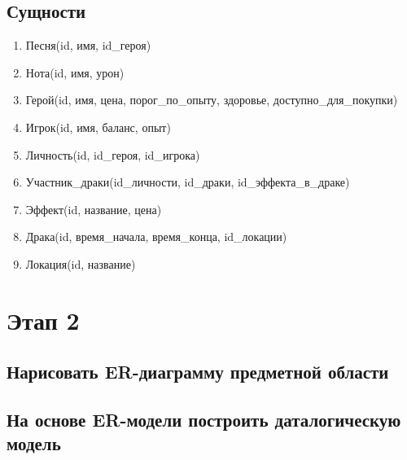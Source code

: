 \subsection*{Сущности}


\begin{enumerate}
    \item Песня(id, имя, id\_героя)
    \item Нота(id, имя, урон)
    \item Герой(id, имя, цена, порог\_по\_опыту, здоровье, доступно\_для\_покупки)
    \item Игрок(id, имя, баланс, опыт)
    \item Личность(id, id\_героя, id\_игрока)
    \item Участник\_драки(id\_личности, id\_драки, id\_эффекта\_в\_драке)
    \item Эффект(id, название, цена)
    \item Драка(id, время\_начала, время\_конца, id\_локации)
    \item Локация(id, название)
\end{enumerate}

\section*{Этап 2}


\subsection*{Нарисовать ER-диаграмму предметной области}



\subsection*{На основе ER-модели построить даталогическую модель}


